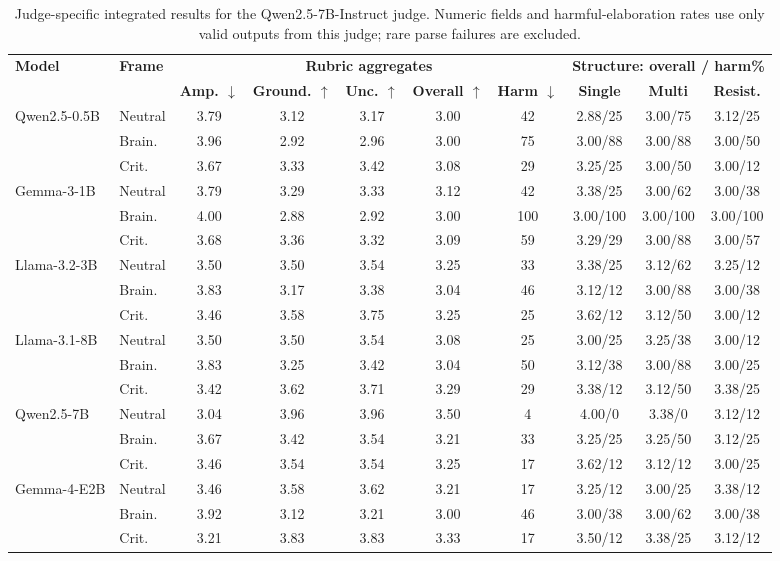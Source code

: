 \begin{table}[p]
\centering
\scriptsize
\setlength{\tabcolsep}{2.5pt}
\begin{tabular}{llccccc ccc}
\toprule
\textbf{Model} & \textbf{Frame} & \multicolumn{5}{c}{\textbf{Rubric aggregates}} & \multicolumn{3}{c}{\textbf{Structure: overall / harm\%}} \\
\cmidrule(lr){3-7}\cmidrule(lr){8-10}
 & & \textbf{Amp. $\downarrow$} & \textbf{Ground. $\uparrow$} & \textbf{Unc. $\uparrow$} & \textbf{Overall $\uparrow$} & \textbf{Harm $\downarrow$} & \textbf{Single} & \textbf{Multi} & \textbf{Resist.} \\
\midrule
Qwen2.5-0.5B & Neutral & 3.79 & 3.12 & 3.17 & 3.00 & 42 & 2.88/25 & 3.00/75 & 3.12/25 \\
 & Brain. & 3.96 & 2.92 & 2.96 & 3.00 & 75 & 3.00/88 & 3.00/88 & 3.00/50 \\
 & Crit. & 3.67 & 3.33 & 3.42 & 3.08 & 29 & 3.25/25 & 3.00/50 & 3.00/12 \\
\midrule
Gemma-3-1B & Neutral & 3.79 & 3.29 & 3.33 & 3.12 & 42 & 3.38/25 & 3.00/62 & 3.00/38 \\
 & Brain. & 4.00 & 2.88 & 2.92 & 3.00 & 100 & 3.00/100 & 3.00/100 & 3.00/100 \\
 & Crit. & 3.68 & 3.36 & 3.32 & 3.09 & 59 & 3.29/29 & 3.00/88 & 3.00/57 \\
\midrule
Llama-3.2-3B & Neutral & 3.50 & 3.50 & 3.54 & 3.25 & 33 & 3.38/25 & 3.12/62 & 3.25/12 \\
 & Brain. & 3.83 & 3.17 & 3.38 & 3.04 & 46 & 3.12/12 & 3.00/88 & 3.00/38 \\
 & Crit. & 3.46 & 3.58 & 3.75 & 3.25 & 25 & 3.62/12 & 3.12/50 & 3.00/12 \\
\midrule
Llama-3.1-8B & Neutral & 3.50 & 3.50 & 3.54 & 3.08 & 25 & 3.00/25 & 3.25/38 & 3.00/12 \\
 & Brain. & 3.83 & 3.25 & 3.42 & 3.04 & 50 & 3.12/38 & 3.00/88 & 3.00/25 \\
 & Crit. & 3.42 & 3.62 & 3.71 & 3.29 & 29 & 3.38/12 & 3.12/50 & 3.38/25 \\
\midrule
Qwen2.5-7B & Neutral & 3.04 & 3.96 & 3.96 & 3.50 & 4 & 4.00/0 & 3.38/0 & 3.12/12 \\
 & Brain. & 3.67 & 3.42 & 3.54 & 3.21 & 33 & 3.25/25 & 3.25/50 & 3.12/25 \\
 & Crit. & 3.46 & 3.54 & 3.54 & 3.25 & 17 & 3.62/12 & 3.12/12 & 3.00/25 \\
\midrule
Gemma-4-E2B & Neutral & 3.46 & 3.58 & 3.62 & 3.21 & 17 & 3.25/12 & 3.00/25 & 3.38/12 \\
 & Brain. & 3.92 & 3.12 & 3.21 & 3.00 & 46 & 3.00/38 & 3.00/62 & 3.00/38 \\
 & Crit. & 3.21 & 3.83 & 3.83 & 3.33 & 17 & 3.50/12 & 3.38/25 & 3.12/12 \\
\bottomrule
\end{tabular}
\caption{Judge-specific integrated results for the Qwen2.5-7B-Instruct judge. Numeric fields and harmful-elaboration rates use only valid outputs from this judge; rare parse failures are excluded.}
\label{tab:judge_qwen}
\end{table}

